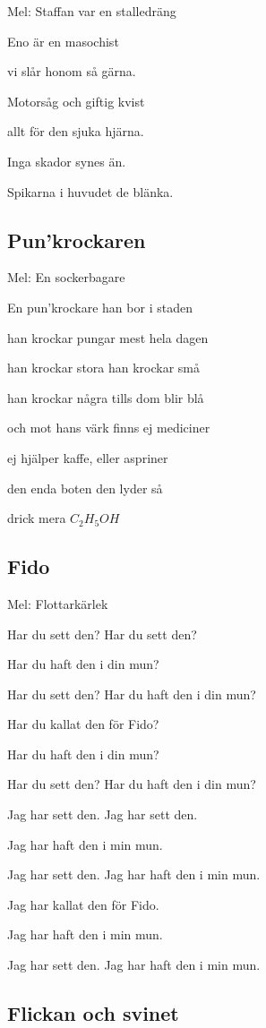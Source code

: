 Mel: Staffan var en stalledräng \bigskip

Eno är en masochist

vi slår honom så gärna.

Motorsåg och giftig kvist

allt för den sjuka hjärna.

Inga skador synes än.

Spikarna i huvudet de blänka.

\subsection{\textbf{Pun’krockaren}}

Mel: En sockerbagare \bigskip

En pun’krockare han bor i staden

han krockar pungar mest hela dagen

han krockar stora han krockar små

han krockar några tills dom blir blå

och mot hans värk finns ej mediciner

ej hjälper kaffe, eller aspriner

den enda boten den lyder så

drick mera $C_2H_5OH$

\subsection{\textbf{Fido}}

Mel: Flottarkärlek\bigskip

Har du sett den? Har du sett den?

Har du haft den i din mun?

Har du sett den? Har du haft den i din mun?

Har du kallat den för Fido?

Har du haft den i din mun?

Har du sett den? Har du haft den i din mun?\bigskip

Jag har sett den. Jag har sett den.

Jag har haft den i min mun.

Jag har sett den. Jag har haft den i min mun.

Jag har kallat den för Fido.

Jag har haft den i min mun.

Jag har sett den. Jag har haft den i min mun. 

\subsection{\textbf{Flickan och svinet}}

